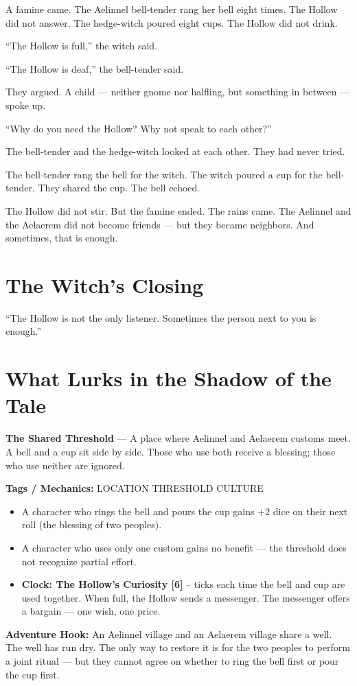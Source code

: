 \documentclass[10pt,twoside]{book}
\newcommand{\tag}[1]{\textsc{#1}}
\begin{document}
A famine came. The Aelinnel bell-tender rang her bell eight times. The Hollow did not answer. The hedge-witch poured eight cups. The Hollow did not drink.

``The Hollow is full,'' the witch said.

``The Hollow is deaf,'' the bell-tender said.

They argued. A child --- neither gnome nor halfling, but something in between --- spoke up.

``Why do you need the Hollow? Why not speak to each other?''

The bell-tender and the hedge-witch looked at each other. They had never tried.

The bell-tender rang the bell for the witch. The witch poured a cup for the bell-tender. They shared the cup. The bell echoed.

The Hollow did not stir. But the famine ended. The rains came. The Aelinnel and the Aelaerem did not become friends --- but they became neighbors. And sometimes, that is enough.

\section*{The Witch's Closing}
``The Hollow is not the only listener. Sometimes the person next to you is enough.''

\section*{What Lurks in the Shadow of the Tale}
\begin{infobox}
\textbf{The Shared Threshold} --- A place where Aelinnel and Aelaerem customs meet. A bell and a cup sit side by side. Those who use both receive a blessing; those who use neither are ignored.

\textbf{Tags / Mechanics:} \tag{LOCATION} \tag{THRESHOLD} \tag{CULTURE}

\begin{itemize}
\item A character who rings the bell and pours the cup gains +2 dice on their next roll (the blessing of two peoples).
\item A character who uses only one custom gains no benefit --- the threshold does not recognize partial effort.
\item \textbf{Clock: The Hollow's Curiosity [6]} -- ticks each time the bell and cup are used together. When full, the Hollow sends a messenger. The messenger offers a bargain --- one wish, one price.
\end{itemize}

\textbf{Adventure Hook:} An Aelinnel village and an Aelaerem village share a well. The well has run dry. The only way to restore it is for the two peoples to perform a joint ritual --- but they cannot agree on whether to ring the bell first or pour the cup first.
\end{infobox}
\end{document}
